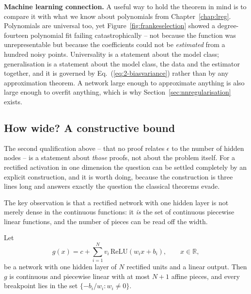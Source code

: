 \begin{notebox}
\textbf{Machine learning connection.} A useful way to hold the theorem in mind
is to compare it with what we know about polynomials from
Chapter~\ref{chap:lreg}.  Polynomials are universal too, yet
Figure~\ref{fig:frankeselection} showed a degree-fourteen polynomial fit
failing catastrophically -- not because the function was unrepresentable but
because the coefficients could not be \emph{estimated} from a hundred noisy
points.  Universality is a statement about the model class; generalisation is a
statement about the model class, the data and the estimator together, and it is
governed by Eq.~(\ref{eq:2-biasvariance}) rather than by any approximation
theorem.  A network large enough to approximate anything is also large enough
to overfit anything, which is why Section~\ref{sec:nnregularisation} exists.
\end{notebox}

\subsection{How wide?  A constructive bound}
\label{sec:universalwidth}

The second qualification above -- that no proof relates $\epsilon$ to the
number of hidden nodes -- is a statement about \emph{those} proofs, not about
the problem itself.  For a rectified activation in one dimension the question
can be settled completely by an explicit construction, and it is worth doing,
because the construction is three lines long and answers exactly the question
the classical theorems evade.

The key observation is that a rectified network with one hidden layer is not
merely dense in the continuous functions: it \emph{is} the set of continuous
piecewise linear functions, and the number of pieces can be read off the width.

\begin{lemma}
\label{lem:8-pieces}
Let
\begin{equation}
  g(x) = c + \sum_{i=1}^{N} v_i\,\mathrm{ReLU}\!\left(w_ix+b_i\right),
  \qquad x\in\mathbb{R},
  \label{eq:8-shallowrelu}
\end{equation}
be a network with one hidden layer of $N$ rectified units and a linear output.
Then $g$ is continuous and piecewise linear with at most $N+1$ affine pieces,
and every breakpoint lies in the set $\{-b_i/w_i : w_i\neq0\}$.
\end{lemma}

